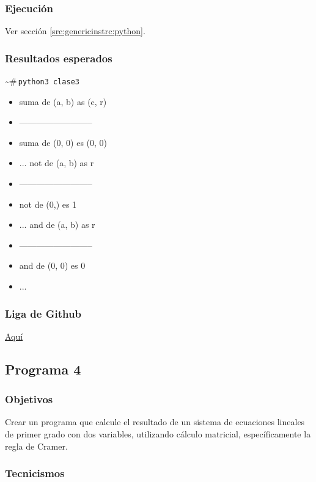 \documentclass{article}[12pt,a4paper]
\newcommand{\bashps}{\textasciitilde\#\,}
\begin{document}
\subsubsection{Ejecución}

Ver sección \ref{src:genericinstrc:python}.

\subsubsection{Resultados esperados}

\bashps\texttt{python3 clase3}

\begin{itemize}
  \item[] suma de (a, b) as (c, r)
  \item[] --------------------------
  \item[] suma de (0, 0) es (0, 0)
  \item[] ...
          not de (a, b) as r
  \item[] --------------------------
  \item[] not de (0,) es 1
  \item[] ...
          and de (a, b) as r
  \item[] --------------------------
  \item[] and de (0, 0) es 0
  \item[] ...
\end{itemize}

\subsubsection{Liga de \textbf{Github}}

\href{https://github.com/MarcosHCK/master-programming/tree/master/clase3}{Aquí \faGithubSquare}

\subsection{Programa 4}

\subsubsection{Objetivos}

Crear un programa que calcule el resultado de un sistema de ecuaciones lineales de primer grado con dos variables, utilizando cálculo matricial, específicamente la regla de Cramer.

\subsubsection{Tecnicismos}
\end{document}
